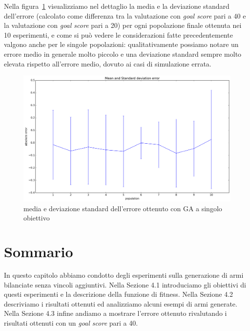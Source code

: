 \documentclass[12pt, italian]{toptesi}
\begin{document}
Nella figura~\ref{fig:single_obj_err} visualizziamo nel dettaglio la media e la deviazione standard dell'errore (calcolato come differenza tra la valutazione con \emph{goal score} pari a 40 e la valutazione con \emph{goal score} pari a 20) per ogni popolazione finale ottenuta nei 10 esperimenti, e come si può vedere le considerazioni fatte precedentemente valgono anche per le singole popolazioni: qualitativamente possiamo notare un errore medio in generale molto piccolo e una deviazione standard sempre molto elevata rispetto all'errore medio, dovuto ai casi di simulazione errata.

\begin{figure}[tp]
\centering
\includegraphics[width=1.0\textwidth]{single_obj_error}
\caption{media e deviazione standard dell'errore ottenuto con GA a singolo obiettivo}
\label{fig:single_obj_err}
\end{figure}

\section{Sommario}
In questo capitolo abbiamo condotto degli esperimenti sulla generazione di armi bilanciate senza vincoli aggiuntivi.
Nella Sezione 4.1 introduciamo gli obiettivi di questi esperimenti e la descrizione della funzione di fitness.
Nella Sezione 4.2 descriviamo i risultati ottenuti ed analizziamo alcuni esempi di armi generate.
Nella Sezione 4.3 infine andiamo a mostrare l'errore ottenuto rivalutando i risultati ottenuti con un \emph{goal score} pari a 40.
\end{document}
